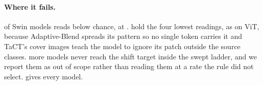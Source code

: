 \paragraph{Where it fails.}
\SwinRecommendedBelowChance{} of \SwinRecommendedN{} Swin models reads below chance, \SwinRecommendedFloorCell{} at \SwinRecommendedFloor{}. \SwinHardestAttacks{} hold the four lowest readings, as on ViT, because Adaptive-Blend spreads its pattern so no single token carries it and TaCT's cover images teach the model to ignore its patch outside the source classes. \SwinShiftTargetUnreached{} more models never reach the \AdaptiveShiftTarget{} shift target inside the swept ladder, and we report them as out of scope rather than reading them at a rate the rule did not select.  gives every model.
